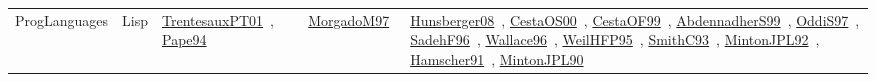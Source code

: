 {\begin{longtable}{lp{3cm}>{\raggedright\arraybackslash}p{6cm}>{\raggedright\arraybackslash}p{6cm}>{\raggedright\arraybackslash}p{8cm}}
\index{Lisp}\index{ProgLanguages!Lisp}ProgLanguages & Lisp & \href{../works/TrentesauxPT01.pdf}{TrentesauxPT01}~\cite{TrentesauxPT01}, \href{../works/Pape94.pdf}{Pape94}~\cite{Pape94} & \href{../works/MorgadoM97.pdf}{MorgadoM97}~\cite{MorgadoM97} & \href{../works/Hunsberger08.pdf}{Hunsberger08}~\cite{Hunsberger08}, \href{../works/CestaOS00.pdf}{CestaOS00}~\cite{CestaOS00}, \href{../works/CestaOF99.pdf}{CestaOF99}~\cite{CestaOF99}, \href{../works/AbdennadherS99.pdf}{AbdennadherS99}~\cite{AbdennadherS99}, \href{../works/OddiS97.pdf}{OddiS97}~\cite{OddiS97}, \href{../works/SadehF96.pdf}{SadehF96}~\cite{SadehF96}, \href{../works/Wallace96.pdf}{Wallace96}~\cite{Wallace96}, \href{../works/WeilHFP95.pdf}{WeilHFP95}~\cite{WeilHFP95}, \href{../works/SmithC93.pdf}{SmithC93}~\cite{SmithC93}, \href{../works/MintonJPL92.pdf}{MintonJPL92}~\cite{MintonJPL92}, \href{../works/Hamscher91.pdf}{Hamscher91}~\cite{Hamscher91}, \href{../works/MintonJPL90.pdf}{MintonJPL90}~\cite{MintonJPL90}\\

\end{longtable}}
